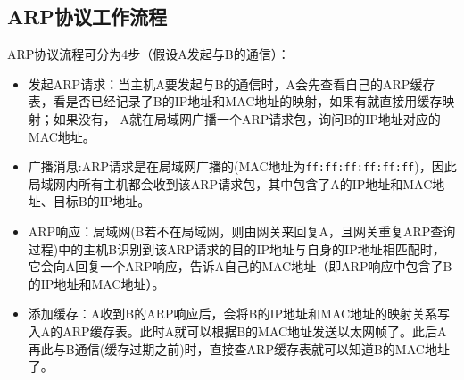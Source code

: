 \subsection{ARP协议工作流程}
ARP协议流程可分为4步（假设A发起与B的通信）：
\begin{itemize}
    \item 发起ARP请求：当主机A要发起与B的通信时，A会先查看自己的ARP缓存表，看是否已经记录了B的IP地址和MAC地址的映射，如果有就直接用缓存映射；如果没有，
A就在局域网广播一个ARP请求包，询问B的IP地址对应的MAC地址。
    \item 广播消息:ARP请求是在局域网广播的(MAC地址为\texttt{ff:ff:ff:ff:ff:ff})，因此局域网内所有主机都会收到该ARP请求包，其中包含了A的IP地址和MAC地址、目标B的IP地址。
    \item ARP响应：局域网(B若不在局域网，则由网关来回复A，且网关重复ARP查询过程)中的主机B识别到该ARP请求的目的IP地址与自身的IP地址相匹配时，它会向A回复一个ARP响应，告诉A自己的MAC地址（即ARP响应中包含了B的IP地址和MAC地址）。
    \item 添加缓存：A收到B的ARP响应后，会将B的IP地址和MAC地址的映射关系写入A的ARP缓存表。此时A就可以根据B的MAC地址发送以太网帧了。此后A再此与B通信(缓存过期之前)时，直接查ARP缓存表就可以知道B的MAC地址了。
\end{itemize}